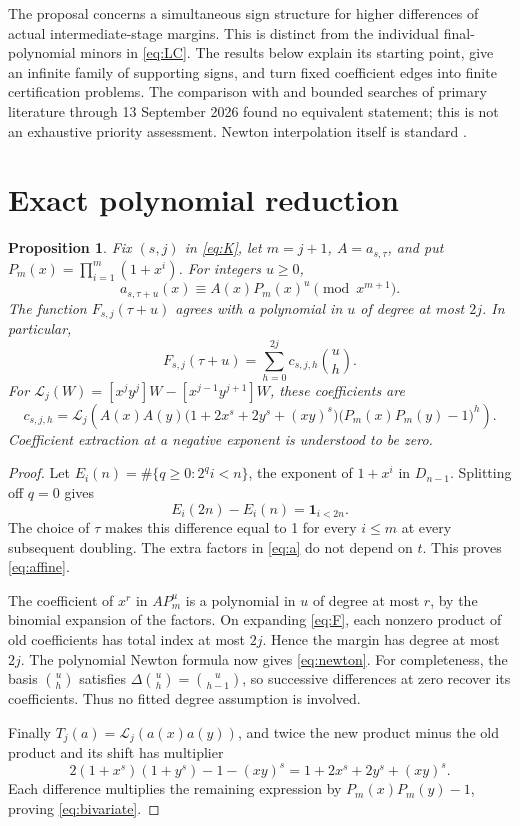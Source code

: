 \documentclass[11pt]{article}
\newtheorem{proposition}[theorem]{Proposition}
\newcommand{\Lfun}{\mathcal L}
\newcommand{\ind}{\mathbf 1}
\begin{document}
The proposal concerns a simultaneous sign structure for higher differences
of actual intermediate-stage margins. This is distinct from the
individual final-polynomial minors in \eqref{eq:LC}. The results below
explain its starting point, give an infinite family of supporting signs,
and turn fixed coefficient edges into finite certification problems.
The comparison with \cite{BBFM,COZ} and bounded searches of primary
literature through 13 September 2026 found no equivalent statement;
this is not an exhaustive priority assessment. Newton interpolation itself
is standard \cite[Section 3.3(iv)]{DLMF}.

\section{Exact polynomial reduction}

\begin{proposition}\label{prop:reduction}
Fix $(s,j)$ in \eqref{eq:K}, let $m=j+1$, $A=a_{s,\tau}$, and put
$P_m(x)=\prod_{i=1}^m(1+x^i)$. For integers $u\geq0$,
\begin{equation}\label{eq:affine}
 a_{s,\tau+u}(x)\equiv A(x)P_m(x)^u\pmod{x^{m+1}}.
\end{equation}
The function $F_{s,j}(\tau+u)$ agrees with a polynomial in $u$ of degree
at most $2j$. In particular,
\begin{equation}\label{eq:newton}
 F_{s,j}(\tau+u)=\sum_{h=0}^{2j}c_{s,j,h}\binom uh.
\end{equation}
For $\Lfun_j(W)=[x^jy^j]W-[x^{j-1}y^{j+1}]W$, these coefficients are
\begin{equation}\label{eq:bivariate}
 c_{s,j,h}=\Lfun_j\!\left(
 A(x)A(y)\bigl(1+2x^s+2y^s+(xy)^s\bigr)
       \bigl(P_m(x)P_m(y)-1\bigr)^h\right).
\end{equation}
Coefficient extraction at a negative exponent is understood to be zero.
\end{proposition}

\begin{proof}
Let $E_i(n)=\#\{q\geq0:2^qi<n\}$, the exponent of $1+x^i$ in
$D_{n-1}$. Splitting off $q=0$ gives
\[
 E_i(2n)-E_i(n)=\ind_{i<2n}.
\]
The choice of $\tau$ makes this difference equal to 1 for every $i\leq m$
at every subsequent doubling. The extra factors in \eqref{eq:a} do not
depend on $t$. This proves \eqref{eq:affine}.

The coefficient of $x^r$ in $AP_m^u$ is a polynomial in $u$ of degree at
most $r$, by the binomial expansion of the factors. On expanding
\eqref{eq:F}, each nonzero product of old coefficients has total index
at most $2j$. Hence the margin has degree at most $2j$. The polynomial
Newton formula now gives \eqref{eq:newton}. For completeness, the basis
$\binom uh$ satisfies $\Delta\binom uh=\binom u{h-1}$, so successive
differences at zero recover its coefficients. Thus no fitted degree
assumption is involved.

Finally $T_j(a)=\Lfun_j(a(x)a(y))$, and twice the new product minus the
old product and its shift has multiplier
\[
 2(1+x^s)(1+y^s)-1-(xy)^s=1+2x^s+2y^s+(xy)^s.
\]
Each difference multiplies the remaining expression by
$P_m(x)P_m(y)-1$, proving \eqref{eq:bivariate}.
\end{proof}
\end{document}
